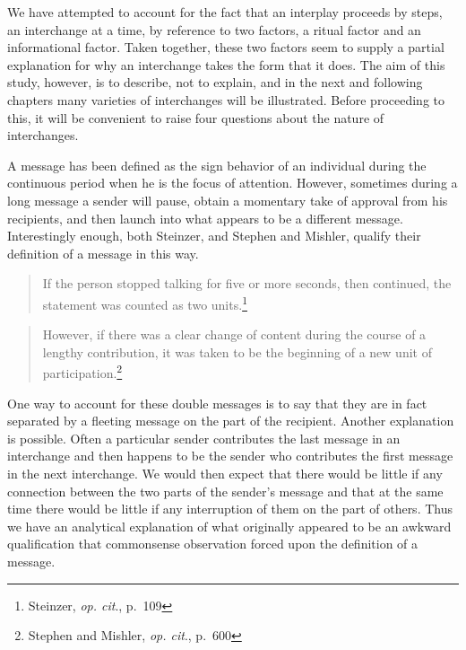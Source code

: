 \documentclass[twoside,symmetric,nobib,justified]{tufte-book}
\begin{document}
\newpage We have attempted to account for the fact that an interplay proceeds by
steps, an interchange at a time, by reference to two factors, a ritual
factor and an informational factor. Taken together, these two factors
seem to supply a partial explanation for why an interchange takes the
form that it does. The aim of this study, however, is to describe, not
to explain, and in the next and following chapters many varieties of
interchanges will be illustrated. Before proceeding to this, it will be
convenient to raise four questions about the nature of interchanges.

A message has been defined as the sign behavior of an individual during
the continuous period when he is the focus of attention. However,
sometimes during a long message a sender will pause, obtain a momentary
take of approval from his recipients, and then launch into what appears
to be a different message. Interestingly enough, both Steinzer, and
Stephen and Mishler, qualify their definition of a message in this way.

\begin{quote}
If the person stopped talking for five or more seconds, then continued,
the statement was counted as two units.\footnote{Steinzer, \emph{op.
  cit}., p.~109}
\end{quote}

\begin{quote}
However, if there was a clear change of content during the course of a
lengthy contribution, it was taken to be the beginning of a new unit of
participation.\footnote{Stephen and Mishler, \emph{op. cit}., p.~600}
\end{quote}

One way to account for these double messages is to say that they are in
fact separated by a fleeting message on the part of the recipient.
Another explanation is possible. Often a particular sender contributes
the last message in an interchange and then happens to be the sender who
contributes the first message in the next interchange. We would then
expect that there would be little if any connection between the two
parts of the sender's message and that at the same time there would be
little if any interruption of them on the part of others. Thus we have
an analytical explanation of what originally appeared to be an awkward
qualification that commonsense observation forced upon the definition of
a message.
\end{document}
